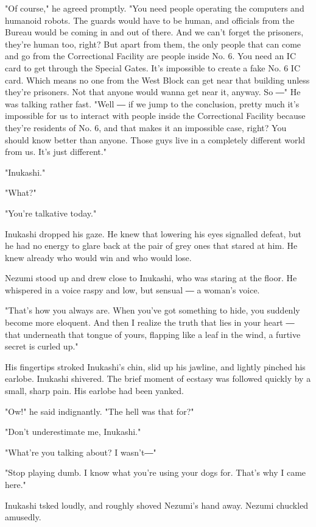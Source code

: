"Of course," he agreed promptly. "You need people operating the
computers and humanoid robots. The guards would have to be human, and
officials from the Bureau would be coming in and out of there. And we
can't forget the prisoners, they're human too, right? But apart from
them, the only people that can come and go from the Correctional
Facility are people inside No. 6. You need an IC card to get through the
Special Gates. It's impossible to create a fake No. 6 IC card. Which
means no one from the West Block can get near that building unless
they're prisoners. Not that anyone would wanna get near it, anyway. So
―" He was talking rather fast. "Well ― if we jump to the conclusion,
pretty much it's impossible for us to interact with people inside the
Correctional Facility because they're residents of No. 6, and that makes
it an impossible case, right? You should know better than anyone. Those
guys live in a completely different world from us. It's just different."

"Inukashi."

"What?"

"You're talkative today."

Inukashi dropped his gaze. He knew that lowering his eyes signalled
defeat, but he had no energy to glare back at the pair of grey ones that
stared at him. He knew already who would win and who would lose.

Nezumi stood up and drew close to Inukashi, who was staring at the
floor. He whispered in a voice raspy and low, but sensual ― a woman's
voice.

"That's how you always are. When you've got something to hide, you
suddenly become more eloquent. And then I realize the truth that lies in
your heart ― that underneath that tongue of yours, flapping like a leaf
in the wind, a furtive secret is curled up."

His fingertips stroked Inukashi's chin, slid up his jawline, and lightly
pinched his earlobe. Inukashi shivered. The brief moment of ecstasy was
followed quickly by a small, sharp pain. His earlobe had been yanked.

"Ow!" he said indignantly. "The hell was that for?"

"Don't underestimate me, Inukashi."

"What're you talking about? I wasn't―"

"Stop playing dumb. I know what you're using your dogs for. That's why I
came here."

Inukashi tsked loudly, and roughly shoved Nezumi's hand away. Nezumi
chuckled amusedly.

